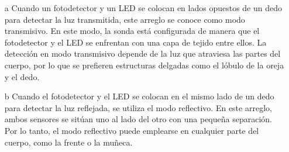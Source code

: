             \begin{enumerate}
                \item [a] Cuando un fotodetector y un LED se colocan en lados opuestos de un dedo para detectar la luz transmitida, este arreglo se conoce como modo transmisivo. En este modo, la sonda está configurada de manera que el fotodetector y el LED se enfrentan con una capa de tejido entre ellos. La detección en modo transmisivo depende de la luz que atraviesa las partes del cuerpo, por lo que se prefieren estructuras delgadas como el lóbulo de la oreja y el dedo.
                \item [b] Cuando el fotodetector y el LED se colocan en el mismo lado de un dedo para detectar la luz reflejada, se utiliza el modo reflectivo. En este arreglo, ambos sensores se sitúan uno al lado del otro con una pequeña separación. Por lo tanto, el modo reflectivo puede emplearse en cualquier parte del cuerpo, como la frente o la muñeca.
            \end{enumerate}

